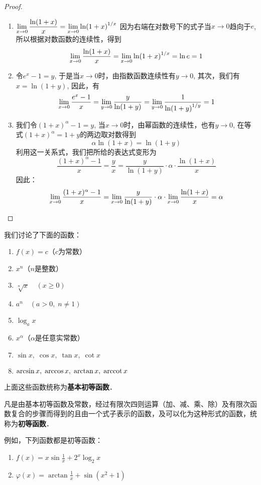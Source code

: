 \begin{proof}
\begin{enumerate}
    \item $\displaystyle\lim_{x\to 0} \dfrac{\ln(1+x)}{x}=\displaystyle\lim_{x\to 0} \ln(1+x)^{1/x}$
    因为右端在对数号下的式子当$x\to 0$趋向于$e$, 所以根据对数函数的连续性，得到
\[\displaystyle\lim_{x\to 0} \dfrac{\ln(1+x)}{x}=\displaystyle\lim_{x\to 0} \ln(1+x)^{1/x}=\ln e=1\]
\item 令$e^x-1=y$, 于是当$x\to 0$时，由指数函数连续性有$y\to 0$, 其次，我们有$x=\ln(1+y)$, 因此，有
\[\displaystyle\lim_{x\to 0}\dfrac{e^x-1}{x}=\displaystyle\lim_{y\to 0}\dfrac{y}{\ln(1+y)}=\displaystyle\lim_{y\to 0}\dfrac{1}{\ln(1+y)^{1/y}}=1\]
\item 我们令$(1+x)^{\alpha}-1=y$, 当$x\to 0$时，由幂函数的连续性，也有$y\to 0$, 在等式$(1+x)^{\alpha}=1+y$的两边取对数得到
\[\alpha\ln (1+x) =\ln (1+y) \]
利用这一关系式，我们把所给的表达式变形为
\[\frac{(1+x)^\alpha-1}{x}=\frac{y}{x}=\frac{y}{\ln(1+y)}\cdot \alpha\cdot\frac{\ln(1+x)}{x}\]
因此：
\[\displaystyle\lim_{x\to 0} \dfrac{(1+x)^\alpha-1}{x}=   \displaystyle\lim_{x\to 0} \dfrac{y}{\ln(1+y)}\cdot \alpha\cdot   \displaystyle\lim_{x\to 0}  \dfrac{\ln(1+x)}{x}=\alpha\]
\end{enumerate}
\end{proof}

我们讨论了下面的函数：
\begin{enumerate}
    \item $f(x)=c$\quad （$c$为常数）
    \item $x^n$\quad（$n$是整数）
    \item $\sqrt[n]{x}\quad (x\ge 0)$
    \item $a^n\quad (a>0,\; n\ne 1)$
    \item $\log_a x$
    \item $x^\alpha$\quad （$\alpha$是任意实常数）
    \item $\sin x,\; \cos x, \; \tan x,\; \cot x$
    \item $\arcsin x,\; \arccos x, \; \arctan x,\; \arccot x$
\end{enumerate}
上面这些函数统称为\textbf{基本初等函数}．

凡是由基本初等函数及常数，经过有限次四则运算（加、减、乘、除）及有限次函数复合的步骤而得到的且由一个式子表示的函数，及可以化为这种形式的函数，统称为\textbf{初等函数}．

例如，下列函数都是初等函数：
\begin{enumerate}
    \item $f(x)=x\sin\frac{1}{x}+2^x\log_2 x$
    \item $\varphi(x)=\arctan\frac{1}{x}+\sin(x^2+1)$
\end{enumerate}

